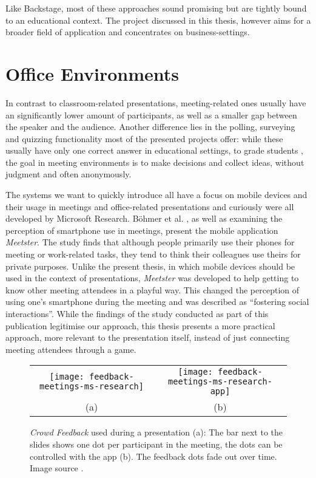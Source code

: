 Like Backstage, most of these approaches sound promising but are tightly bound to an educational context. The project discussed in this thesis, however aims for a broader field of application and concentrates on business-settings.

\section{Office Environments}
\label{sec:related-work-office}

In contrast to classroom-related presentations, meeting-related ones usually have an significantly lower amount of participants, as well as a smaller gap between the speaker and the audience. Another difference lies in the polling, surveying and quizzing functionality most of the presented projects offer: while these usually have only one correct answer in educational settings, to grade students \cite{Lindquist:ExploringMobilePhonesActiveLearning, Triglianos:InteractiveWebPresentationsImpress, Bry:Backstage}, the goal in meeting environments is to make decisions and collect ideas, without judgment and often anonymously.

The systems we want to quickly introduce all have a focus on mobile devices and their usage in meetings and office-related presentations and curiously were all developed by Microsoft Research. Böhmer et al. \cite{Bohmer:SmartphoneUseRude}, as well as examining the perception of smartphone use in meetings, present the mobile application \emph{Meetster}. The study finds that although people primarily use their phones for meeting or work-related tasks, they tend to think their colleagues use theirs for private purposes. Unlike the present thesis, in which mobile devices should be used in the context of presentations, \emph{Meetster} was developed to help getting to know other meeting attendees in a playful way. This changed the perception of using one's smartphone during the meeting and was described as ``fostering social interactions''. While the findings of the study conducted as part of this publication legitimise our approach, this thesis presents a more practical approach, more relevant to the presentation itself, instead of just connecting meeting attendees through a game.

\begin{figure}
\centering\small
\begin{tabular}{cc}
\texttt{[image: feedback-meetings-ms-research]}
 &
\texttt{[image: feedback-meetings-ms-research-app]} \\
(a) & (b)
\end{tabular}
\caption{\emph{Crowd Feedback} \cite{Teevan:MobileFeedbackDuringPresentation} used during a presentation (a): The bar next to the slides shows one dot per participant in the meeting, the dots can be controlled with the app (b). The feedback dots fade out over time. Image source \cite{Teevan:MobileFeedbackDuringPresentation}.}
\label{fig:related-work-crowd-feedback}
\end{figure}

